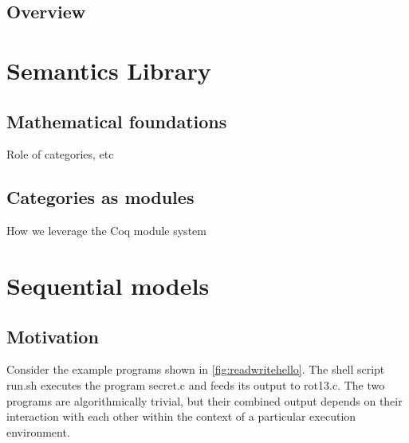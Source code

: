\documentclass{report}
\begin{document}
\section{Overview}


\chapter{Semantics Library} %

\section{Mathematical foundations}

Role of categories, etc

\section{Categories as modules}

How we leverage the Coq module system


\chapter{Sequential models} %

\section{Motivation} %

Consider the example programs shown in \autoref{fig:readwritehello}.
The shell script \textsf{run.sh}
executes the program \textsf{secret.c}
and feeds its output to \textsf{rot13.c}.
The two programs are algorithmically trivial,
but their combined output depends on their interaction with each other
within the context of a particular execution environment.
\end{document}

